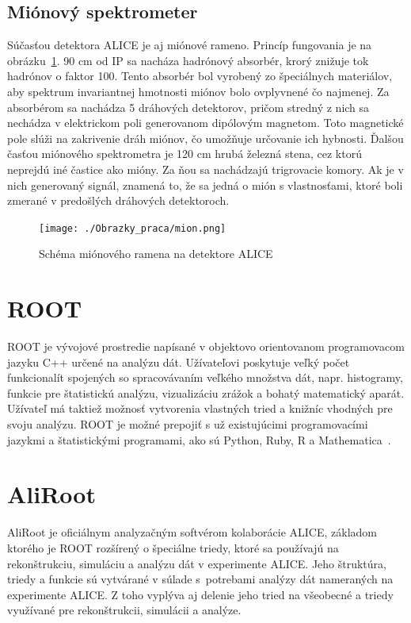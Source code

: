 \documentclass[thesismargins, thesislinespacing]{rnthesis}
\begin{document}
\subsection{Miónový spektrometer}
Súčasťou detektora ALICE je aj miónové rameno. Princíp fungovania je na obrázku~\ref{mion}. 90 cm od IP sa nacháza hadrónový absorbér, krorý znižuje tok hadrónov o faktor 100. Tento absorbér bol vyrobený zo špeciálnych materiálov, aby spektrum invariantnej hmotnosti miónov bolo ovplyvnené čo najmenej. Za absorbérom sa nachádza 5 dráhových detektorov, pričom stredný z nich sa nechádza v elektrickom poli generovanom dipólovým magnetom. Toto magnetické pole slúži na zakrivenie dráh miónov, čo umožňuje určovanie ich hybnosti. Ďalšou časťou miónového spektrometra je 120 cm hrubá železná stena, cez ktorú neprejdú iné častice ako mióny. Za ňou sa nachádzajú trigrovacie komory. Ak je v nich generovaný signál, znamená to, že sa jedná o mión s vlastnosťami, ktoré boli zmerané v predošlých dráhových detektoroch.

\begin{figure}[hbtp!]
	\begin{center}
		\texttt{[image: ./Obrazky\_praca/mion.png]}
		\caption{Schéma miónového ramena na detektore ALICE}
		\label{mion}
	\end{center}
\end{figure}

\section{ROOT}
ROOT je vývojové prostredie napísané v objektovo orientovanom programovacom jazyku C++ určené na analýzu dát. Užívateľovi poskytuje veľký počet funkcionalít spojených so spracovávaním veľkého množstva dát, napr. histogramy, funkcie pre štatistickú analýzu, vizualizáciu zrážok a bohatý matematický aparát. Užívateľ má taktiež možnosť vytvorenia vlastných tried a knižníc vhodných pre svoju analýzu. ROOT je možné prepojiť s už existujúcimi programovacími jazykmi a štatistickými programami, ako sú Python, Ruby, R a Mathematica~\cite{root}.

\section{AliRoot}
AliRoot je oficiálnym analyzačným softvérom kolaborácie ALICE, základom ktorého je ROOT rozšírený o špeciálne triedy, ktoré sa používajú na rekonštrukciu, simuláciu a analýzu dát v experimente ALICE. Jeho štruktúra, triedy a funkcie sú vytvárané v súlade s~potrebami analýzy dát nameraných na experimente ALICE. Z toho vyplýva aj delenie jeho tried na všeobecné a triedy využívané pre rekonštrukcii, simulácii a analýze. 
\end{document}

